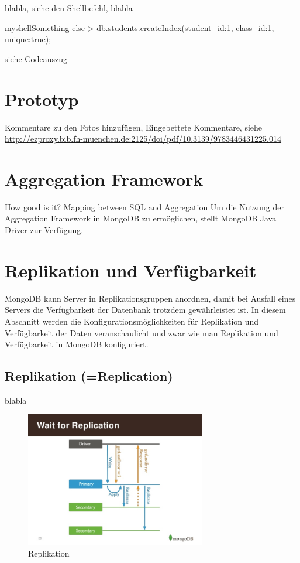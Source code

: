blabla, siehe den Shellbefehl, blabla

\begin{listingsboxShell}[label={lst:X}]{myshell}{Something else}
> db.students.createIndex({student_id:1, class_id:1}, {unique:true});
\end{listingsboxShell}
siehe Codeauszug 

\section{Prototyp}
Kommentare zu den Fotos hinzufügen, Eingebettete Kommentare, siehe \url{http://ezproxy.bib.fh-muenchen.de:2125/doi/pdf/10.3139/9783446431225.014}

\section{Aggregation Framework}
How good is it? Mapping between SQL and Aggregation
Um die Nutzung der Aggregation Framework in MongoDB zu ermöglichen, stellt MongoDB Java Driver zur Verfügung. 

\section{Replikation und Verfügbarkeit}
MongoDB kann Server in Replikationsgruppen anordnen, damit bei Ausfall eines Servers die Verfügbarkeit der Datenbank trotzdem gewährleistet ist. In diesem Abschnitt werden die Konfigurationsmöglichkeiten für Replikation und Verfügbarkeit der Daten veranschaulicht und zwar wie man Replikation und Verfügbarkeit in MongoDB konfiguriert.
\subsection{Replikation (=Replication)}
blabla

\begin{figure}[H]
\centering
\includegraphics[width=0.7\textwidth]{resources/replication}
\caption[Replikation]{Replikation\protect\footnotemark}
\label{img:Replikation}
\end{figure}

